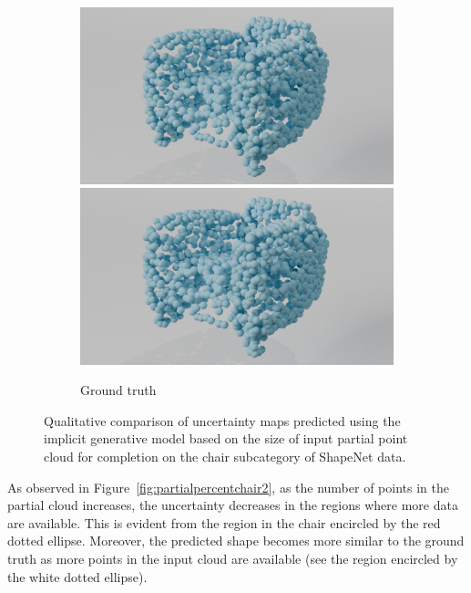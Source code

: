 \begin{figure}[htb]
\begin{subfigure}[t]{0.315\textwidth}
            \includegraphics[width=\textwidth]{figures/percent/chair_comp.png}
            \includegraphics[width=\textwidth]{figures/percent/chair_comp.png}
            \caption{Ground truth}\label{fig:partialpercentchair3}
          \end{subfigure}
          \caption{Qualitative comparison of uncertainty maps predicted using the implicit generative model based on the size of input partial point cloud for completion on the chair subcategory of ShapeNet data.}
          \label{fig:partialpercentchair}
        \end{figure}
        \newline

        As observed in Figure~\ref{fig:partialpercentchair2}, as the number of points in the partial cloud increases, the uncertainty decreases in the regions where more data are available. This is evident from the region in the chair encircled by the red dotted ellipse. Moreover, the predicted shape becomes more similar to the ground truth as more points in the input cloud are available (see the region encircled by the white dotted ellipse).

